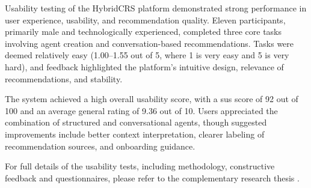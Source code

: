 Usability testing of the HybridCRS platform demonstrated strong performance in user experience, usability, and recommendation quality. Eleven participants, primarily male and technologically experienced, completed three core tasks involving agent creation and conversation-based recommendations. Tasks were deemed relatively easy (1.00–1.55 out of 5, where 1 is very easy and 5 is very hard), and feedback highlighted the platform's intuitive design, relevance of recommendations, and stability.

The system achieved a high overall usability score, with a \ac{sus} score of 92 out of 100 and an average general rating of 9.36 out of 10. Users appreciated the combination of structured and conversational agents, though suggested improvements include better context interpretation, clearer labeling of recommendation sources, and onboarding guidance.

For full details of the usability tests, including methodology, constructive feedback and questionnaires, please refer to the complementary research thesis \cite{MUI2ICSI_THESIS}.